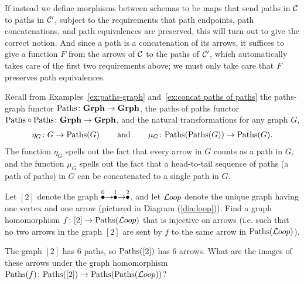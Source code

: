 \documentclass[CT4S-EN-RU]{subfiles}
\begin{document}
\begin{blockRUS}
\end{blockRUS}

\begin{blockENG}
If instead we define morphisms between schemas to be maps that send paths in $\mathcal{C}$ to paths in $\mathcal{C}'$, subject to the requirements that path endpoints, path concatenations, and path equivalences are preserved, this will turn out to give the correct notion. And since a path is a concatenation of its arrows, it suffices to give a function $F$ from the arrows of $\mathcal{C}$ to the paths of $\mathcal{C}'$, which automatically takes care of the first two requirements above; we must only take care that $F$ preserves path equivalences.
\end{blockENG}

\begin{blockRUS}
\end{blockRUS}

\begin{blockENG}
Recall from Examples~\ref{ex:paths-graph} and~\ref{ex:concat paths of paths} the paths-graph functor $\textnormal{Paths}\colon{\mathbf{Grph}}\rightarrow{\mathbf{Grph}}$, the paths of paths functor $\textnormal{Paths}\circ\textnormal{Paths}\colon{\mathbf{Grph}}\rightarrow{\mathbf{Grph}}$, and the natural transformations for any graph $G$, 
\begin{align}\label{dia:proto paths monad}
\eta_G\colon G\rightarrow\textnormal{Paths}(G)\hspace{.3in}\textnormal{and}\hspace{.3in}\mu_G\colon\textnormal{Paths}(\textnormal{Paths}(G))\rightarrow\textnormal{Paths}(G).
\end{align}
The function $\eta_G$ spells out the fact that every arrow in $G$ counts as a path in $G$, and the function $\mu_G$ spells out the fact that a head-to-tail sequence of paths (a path of paths) in $G$ can be concatenated to a single path in $G$.
\end{blockENG}

\begin{blockRUS}
\end{blockRUS}

\begin{exerciseENG}
Let $[2]$ denote the graph $\stackrel{0}{\bullet}\rightarrow\stackrel{1}{\bullet}\rightarrow\stackrel{2}{\bullet}$, and let ${\mathcal{L} oop}$ denote the unique graph having one vertex and one arrow (pictured in Diagram (\ref{dia:loop})).
\sexc Find a graph homomorphism $f\colon[2]\rightarrow\textnormal{Paths}({\mathcal{L} oop})$ that is injective on arrows (i.e. such that no two arrows in the graph $[2]$ are sent by $f$ to the same arrow in $\textnormal{Paths}({\mathcal{L} oop})$).
\item The graph $[2]$ has 6 paths, so $\textnormal{Paths}([2])$ has 6 arrows. What are the images of these arrows under the graph homomorphism $\textnormal{Paths}(f)\colon\textnormal{Paths}([2])\rightarrow\textnormal{Paths}(\textnormal{Paths}({\mathcal{L} oop}))$? 
\endsexc
\end{exerciseENG}
\end{document}
